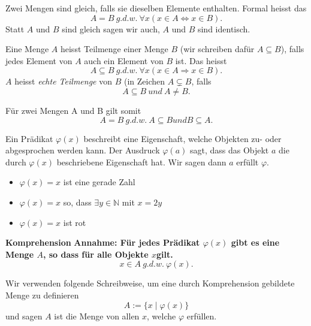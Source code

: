 \documentclass[../DatenbankenFS23.tex]{subfiles}
\begin{document}
\begin{defn}
Zwei Mengen sind gleich, falls sie dieselben Elemente enthalten. Formal
heisst das
\[A = B\ g.d.w.\ \forall x(x \in A \Leftrightarrow x \in B) .\]
Statt $A$ und $B$ sind gleich sagen wir auch, $A$ und $B$ sind identisch.
\end{defn}

\begin{defn}[Teilmengen]
    Eine Menge $A$ heisst Teilmenge einer Menge $B$ (wir schreiben daf\"ur
$A \subseteq B$), falls jedes Element von $A$ auch ein Element von $B$ ist. Das heisst
\[A \subseteq B\ g.d.w.\ \forall x(x \in A \Rightarrow x \in B) .\]
$A$ heisst \emph{echte Teilmenge} von $B$ (in Zeichen $A \subsetneq B$, falls
\[A \subseteq B\ und\ A \neq B .\]
\end{defn}

\begin{bemerkung}
    F\"ur zwei Mengen A und B gilt somit
    \[A = B\ g.d.w.\ A \subseteq B und B \subseteq A .\]
\end{bemerkung}

\begin{defn}[Pr\"adikate]
    Ein Pr\"adikat $\varphi(x)$ beschreibt eine Eigenschaft, welche Objekten zu- oder
    abgesprochen werden kann.
    Der Ausdruck $\varphi(a)$ sagt, dass das Objekt $a$ die durch $\varphi(x)$ beschriebene
    Eigenschaft hat. Wir sagen dann $a$ erf\"ullt $\varphi$.
    
\end{defn}

\begin{beispiel}
    \begin{itemize}
        \item $\varphi(x) = x$ ist eine gerade Zahl
        \item $\varphi(x) = x$ so, dass $\exists y \in \mathbb{N}$ mit $x = 2y$
        \item $\varphi(x) = x$ ist rot
    \end{itemize}
 \end{beispiel}

\begin{wichtig}
    \textbf{Komprehension}\newline
    \textbf{Annahme: F\"ur jedes Pr\"adikat $\varphi(x)$ gibt es eine Menge $A$, so dass f\"ur alle Objekte $x$gilt.}
    \[x \in A\ g.d.w.\ \varphi(x) .\]
        
    Wir verwenden folgende Schreibweise, um eine durch Komprehension
    gebildete Menge zu definieren
    \[A := \{x 	\mid \varphi(x)\}\]
    und sagen $A$ ist die Menge von allen $x$, welche $\varphi$ erf\"ullen.
\end{wichtig}
\end{document}
